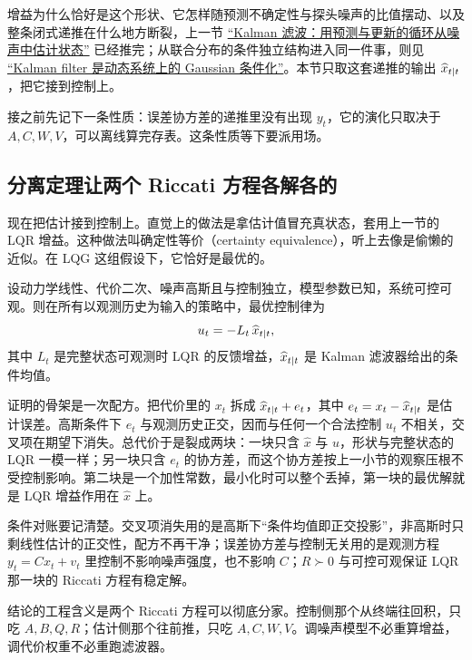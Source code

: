 增益为什么恰好是这个形状、它怎样随预测不确定性与探头噪声的比值摆动、以及整条闭式递推在什么地方断裂，上一节 \hyperref[sec:16-Control-and-Reinforcement-Learning/01-Optimal-Control/04]{``Kalman 滤波：用预测与更新的循环从噪声中估计状态''} 已经推完；从联合分布的条件独立结构进入同一件事，则见 \hyperref[sec:13-Machine-Learning/07-Graphical-and-Sequential-Models/03]{``Kalman filter 是动态系统上的 Gaussian 条件化''}。本节只取这套递推的输出 \(\widehat x_{t\mid t}\)，把它接到控制上。

接之前先记下一条性质：误差协方差的递推里没有出现 \(y_t\)，它的演化只取决于 \(A, C, W, V\)，可以离线算完存表。这条性质等下要派用场。

\subsection{分离定理让两个 Riccati 方程各解各的}

现在把估计接到控制上。直觉上的做法是拿估计值冒充真状态，套用上一节的 LQR 增益。这种做法叫确定性等价（certainty equivalence），听上去像是偷懒的近似。在 LQG 这组假设下，它恰好是最优的。

\begin{theorem}[分离定理]
设动力学线性、代价二次、噪声高斯且与控制独立，模型参数已知，系统可控可观。则在所有以观测历史为输入的策略中，最优控制律为
\[
u_t = -L_t\, \widehat x_{t\mid t},
\]
其中 \(L_t\) 是完整状态可观测时 LQR 的反馈增益，\(\widehat x_{t\mid t}\) 是 Kalman 滤波器给出的条件均值。
\end{theorem}

证明的骨架是一次配方。把代价里的 \(x_t\) 拆成 \(\widehat x_{t\mid t} + e_t\)，其中 \(e_t = x_t - \widehat x_{t\mid t}\) 是估计误差。高斯条件下 \(e_t\) 与观测历史正交，因而与任何一个合法控制 \(u_t\) 不相关，交叉项在期望下消失。总代价于是裂成两块：一块只含 \(\widehat x\) 与 \(u\)，形状与完整状态的 LQR 一模一样；另一块只含 \(e_t\) 的协方差，而这个协方差按上一小节的观察压根不受控制影响。第二块是一个加性常数，最小化时可以整个丢掉，第一块的最优解就是 LQR 增益作用在 \(\widehat x\) 上。

条件对账要记清楚。交叉项消失用的是高斯下``条件均值即正交投影''，非高斯时只剩线性估计的正交性，配方不再干净；误差协方差与控制无关用的是观测方程 \(y_t = Cx_t + v_t\) 里控制不影响噪声强度，也不影响 \(C\)；\(R\succ 0\) 与可控可观保证 LQR 那一块的 Riccati 方程有稳定解。

结论的工程含义是两个 Riccati 方程可以彻底分家。控制侧那个从终端往回积，只吃 \(A, B, Q, R\)；估计侧那个往前推，只吃 \(A, C, W, V\)。调噪声模型不必重算增益，调代价权重不必重跑滤波器。

